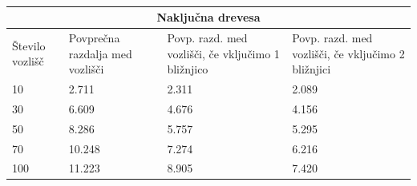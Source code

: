 \documentclass[a4paper,10pt]{article}
\begin{document}
\\[0.5cm]
\begin{tabular}{ |p{3cm}||p{3cm}|p{3cm}|p{3cm}|  }
 \hline
 \multicolumn{4}{|c|}{Naključna drevesa} \\
 \hline
 Število vozlišč& Povprečna razdalja med vozlišči &Povp. razd. med vozlišči, če vključimo 1 bližnjico&Povp. razd. med vozlišči, če vključimo 2 bližnjici\\
 \hline
 10   & 2.711    &2.311&   2.089\\
 30 &6.609 & 4.676& 4.156\\
 50    &8.286 & 5.757& 5.295\\
 70&10.248&7.274&6.216\\
 100&  11.223  & 8.905&7.420\\
 
 \hline
\end{tabular}
\end{document}

